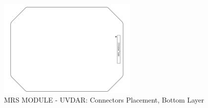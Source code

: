 \documentclass[12pt, a4paper]{article}
\begin{document}
\begin{figure}[h]
\centering
\includegraphics[clip=true, width=0.6\textwidth]{figures/Connectors_bot.pdf}
\caption{MRS MODULE - UVDAR: Connectors Placement, Bottom Layer}
\label{fig:connectors_bot}
\end{figure}


\pagebreak
\end{document}
